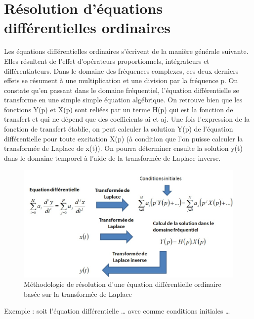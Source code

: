 \documentclass[]{report}
\begin{document}
	\section{Résolution d'équations différentielles ordinaires}
	Les équations différentielles ordinaires s'écrivent de la manière générale suivante. Elles résultent de l'effet d'opérateurs proportionnels, intégrateurs et différentiateurs. Dans le domaine des fréquences complexes, ces deux derniers effets se résument à une multiplication et une division par la fréquence p. On constate qu'en passant dans le domaine fréquentiel, l'équation différentielle se transforme en une simple simple équation algébrique. On retrouve bien que les fonctions Y(p) et X(p) sont reliées par un terme H(p) qui est la fonction de transfert et qui ne dépend que des coefficients ai et aj. Une fois l'expression de la fonction de transfert établie, on peut calculer la solution Y(p) de l'équation différentielle pour toute excitation X(p) (à condition que l'on puisse calculer la transformée de Laplace de x(t)). On pourra déterminer ensuite la solution y(t) dans le domaine temporel à l'aide de la transformée de Laplace inverse.
	\begin{figure}[h!]
		\centering
		\includegraphics[scale=0.6]{images/Methodo_reso_equa_diff_Laplace.jpg}
		\caption{Méthodologie de résolution d'une équation différentielle ordinaire basée sur la transformée de Laplace}	
		\label{Fig:Methodo_reso_equa_diff_Laplace} 
	\end{figure}
	Exemple : soit l'équation différentielle … avec comme conditions initiales …
	
\end{document}
